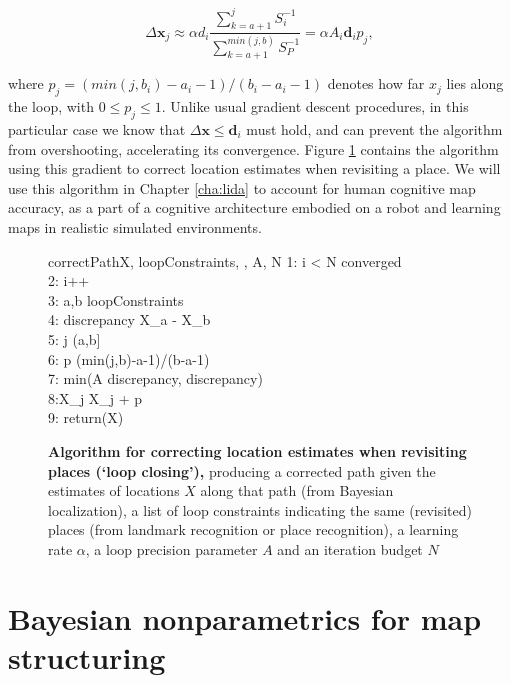 \begin{equation}
\label{correction}
\Delta \bm x_j \approx \alpha d_i \frac{\sum_{k=a+1}^{j} S_i^{-1}}{\sum_{k=a+1}^{min(j,b)} S_P^{-1}} = \alpha A_i \bm d_i p_j,
\end{equation}

\noindent where $p_j=(min(j,b_i)-a_i-1)/(b_i-a_i-1)$ denotes how far $x_j$ lies along the loop, with $0 \leq p_j \leq 1$. Unlike usual gradient descent procedures, in this particular case we know that $\Delta \bm x \leq \bm d_i $ must hold, and can prevent the algorithm from overshooting, accelerating its convergence. Figure \ref{fig:sgdslam} contains the algorithm using this gradient to correct location estimates when revisiting a place. We will use this algorithm in Chapter \ref{cha:lida} to account for human cognitive map accuracy, as a part of a cognitive architecture embodied on a robot and learning maps in realistic simulated environments.

\begin{figure}[h]
	\begin{pseudocode}{correctPath}{X, loopConstraints, \alpha, A, N}
		1: \WHILE i < N \AND \NOT converged \\
		2: \quad i++ \\
		3: \quad \FOREACH a,b \in loopConstraints \\
		4: \quad \quad discrepancy \GETS X_a - X_b \\
		5: \quad \quad \FOREACH j \in (a,b] \\
		6: \quad \quad \quad p \GETS (min(j,b)-a-1)/(b-a-1) \\
		7: \quad \quad \quad \beta \GETS min(\alpha A \cdot discrepancy, discrepancy) \\
		8:\quad\quad\quad X_j \GETS X_j + \beta p \\
		9: return(X)
	\end{pseudocode}
	\caption[Algorithm for correcting location estimates when revisiting places]{\textbf{Algorithm for correcting location estimates when revisiting places (`loop closing'),} producing a corrected path given the estimates of locations $X$ along that path (from Bayesian localization), a list of loop constraints indicating the same (revisited) places (from landmark recognition or place recognition), a learning rate $\alpha$, a loop precision parameter $A$ and an iteration budget $N$}
	\label{fig:sgdslam}
\end{figure}

\section{Bayesian nonparametrics for map structuring}
\label{sec:bayesmap}

